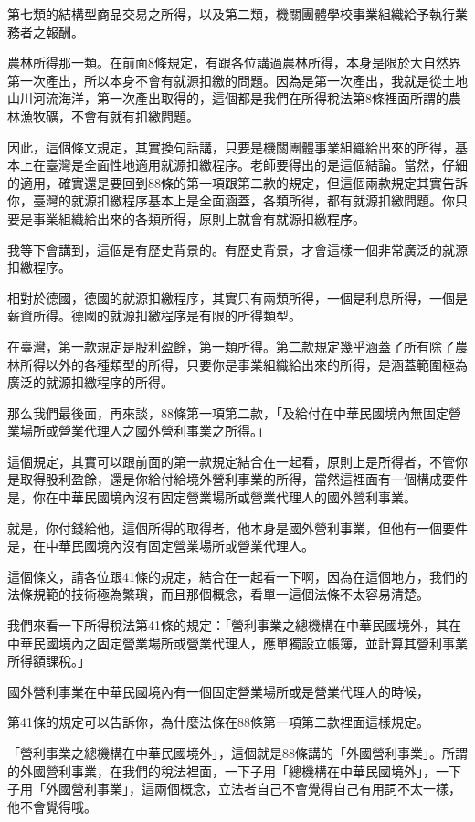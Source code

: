 \documentclass[oneside,sub3section]{ctexbook}
\begin{document}
第七類的結構型商品交易之所得，以及第二類，機關團體學校事業組織給予執行業務者之報酬。

農林所得那一類。在前面8條規定，有跟各位講過農林所得，本身是限於大自然界第一次產出，所以本身不會有就源扣繳的問題。因為是第一次產出，我就是從土地山川河流海洋，第一次產出取得的，這個都是我們在所得稅法第8條裡面所謂的農林漁牧礦，不會有就有扣繳問題。

因此，這個條文規定，其實換句話講，只要是機關團體事業組織給出來的所得，基本上在臺灣是全面性地適用就源扣繳程序。老師要得出的是這個結論。當然，仔細的適用，確實還是要回到88條的第一項跟第二款的規定，但這個兩款規定其實告訴你，臺灣的就源扣繳程序基本上是全面涵蓋，各類所得，都有就源扣繳問題。你只要是事業組織給出來的各類所得，原則上就會有就源扣繳程序。

我等下會講到，這個是有歷史背景的。有歷史背景，才會這樣一個非常廣泛的就源扣繳程序。

相對於德國，德國的就源扣繳程序，其實只有兩類所得，一個是利息所得，一個是薪資所得。德國的就源扣繳程序是有限的所得類型。

在臺灣，第一款規定是股利盈餘，第一類所得。第二款規定幾乎涵蓋了所有除了農林所得以外的各種類型的所得，只要你是事業組織給出來的所得，是涵蓋範圍極為廣泛的就源扣繳程序的所得。

那么我們最後面，再來談，88條第一項第二款，「及給付在中華民國境內無固定營業場所或營業代理人之國外營利事業之所得。」

這個規定，其實可以跟前面的第一款規定結合在一起看，原則上是所得者，不管你是取得股利盈餘，還是你給付給境外營利事業的所得，當然這裡面有一個構成要件是，你在中華民國境內沒有固定營業場所或營業代理人的國外營利事業。

就是，你付錢給他，這個所得的取得者，他本身是國外營利事業，但他有一個要件是，在中華民國境內沒有固定營業場所或營業代理人。

這個條文，請各位跟41條的規定，結合在一起看一下啊，因為在這個地方，我們的法條規範的技術極為繁瑣，而且那個概念，看單一這個法條不太容易清楚。

我們來看一下所得稅法第41條的規定：「營利事業之總機構在中華民國境外，其在中華民國境內之固定營業場所或營業代理人，應單獨設立帳簿，並計算其營利事業所得額課稅。」

國外營利事業在中華民國境內有一個固定營業場所或是營業代理人的時候，

第41條的規定可以告訴你，為什麼法條在88條第一項第二款裡面這樣規定。

「營利事業之總機構在中華民國境外」，這個就是88條講的「外國營利事業」。所謂的外國營利事業，在我們的稅法裡面，一下子用「總機構在中華民國境外」，一下子用「外國營利事業」，這兩個概念，立法者自己不會覺得自己有用詞不太一樣，他不會覺得哦。
\end{document}
